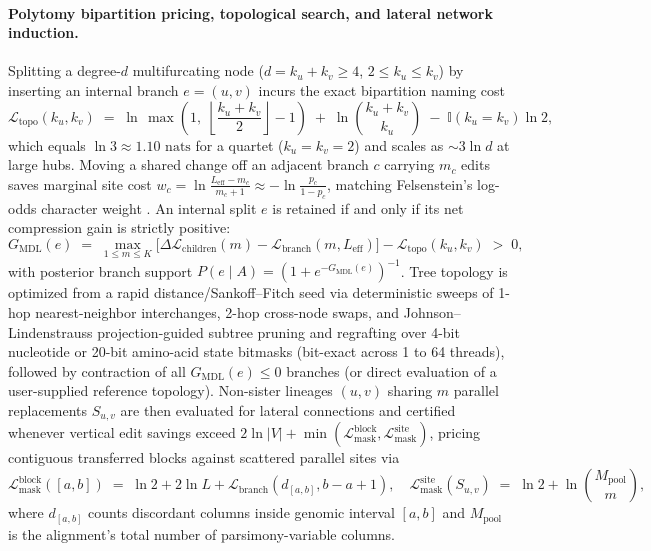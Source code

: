 \documentclass[11pt,a4paper]{article}
\begin{document}
\paragraph{Polytomy bipartition pricing, topological search, and lateral network induction.}
Splitting a degree-$d$ multifurcating node ($d = k_u + k_v \ge 4$, $2 \le k_u \le k_v$) by inserting an internal branch $e = (u,v)$ incurs the exact bipartition naming cost
\begin{equation}
    \mathcal{L}_{\text{topo}}(k_u, k_v) \;=\; \ln\,\max\!\left(1,\; \left\lfloor\frac{k_u + k_v}{2}\right\rfloor - 1\right) \;+\; \ln\binom{k_u + k_v}{k_u} \;-\; \mathbb{I}(k_u = k_v)\ln 2,
    \label{eq:sci_topo}
\end{equation}
which equals $\ln 3 \approx 1.10\text{ nats}$ for a quartet ($k_u = k_v = 2$) and scales as $\sim 3\ln d$ at large hubs. Moving a shared change off an adjacent branch $c$ carrying $m_c$ edits saves marginal site cost $w_c = \ln\frac{L_{\text{eff}} - m_c}{m_c + 1} \approx -\ln\frac{p_c}{1 - p_c}$, matching Felsenstein's log-odds character weight \citep{felsenstein1981evolutionary}. An internal split $e$ is retained if and only if its net compression gain is strictly positive:
\begin{equation}
    G_{\text{MDL}}(e) \;=\; \max_{1 \le m \le K} \Big[ \Delta\mathcal{L}_{\text{children}}(m) - \mathcal{L}_{\text{branch}}(m, L_{\text{eff}}) \Big] - \mathcal{L}_{\text{topo}}(k_u, k_v) \;>\; 0,
    \label{eq:sci_gain}
\end{equation}
with posterior branch support $P(e \mid A) = (1 + e^{-G_{\text{MDL}}(e)})^{-1}$. Tree topology is optimized from a rapid distance/Sankoff--Fitch seed via deterministic sweeps of 1-hop nearest-neighbor interchanges, 2-hop cross-node swaps, and Johnson--Lindenstrauss projection-guided subtree pruning and regrafting over 4-bit nucleotide or 20-bit amino-acid state bitmasks (bit-exact across 1 to 64 threads), followed by contraction of all $G_{\text{MDL}}(e) \le 0$ branches (or direct evaluation of a user-supplied reference topology). Non-sister lineages $(u,v)$ sharing $m$ parallel replacements $S_{u,v}$ are then evaluated for lateral connections and certified whenever vertical edit savings exceed $2\ln|V| + \min(\mathcal{L}_{\text{mask}}^{\text{block}}, \mathcal{L}_{\text{mask}}^{\text{site}})$, pricing contiguous transferred blocks against scattered parallel sites via
\begin{equation}
    \mathcal{L}_{\text{mask}}^{\text{block}}([a,b]) \;=\; \ln 2 + 2\ln L + \mathcal{L}_{\text{branch}}(d_{[a,b]}, b - a + 1), \quad
    \mathcal{L}_{\text{mask}}^{\text{site}}(S_{u,v}) \;=\; \ln 2 + \ln\binom{M_{\text{pool}}}{m},
    \label{eq:sci_shunt}
\end{equation}
where $d_{[a,b]}$ counts discordant columns inside genomic interval $[a,b]$ and $M_{\text{pool}}$ is the alignment's total number of parsimony-variable columns.
\end{document}
